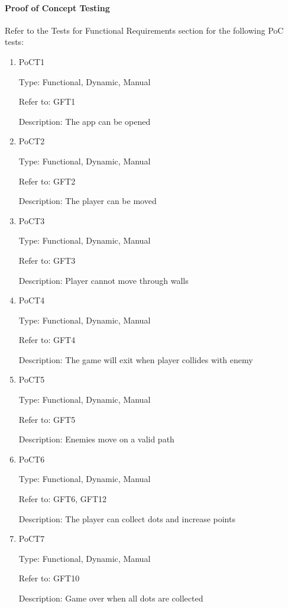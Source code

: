 \documentclass[12pt, titlepage]{article}
\begin{document}
\paragraph{Proof of Concept Testing}

Refer to the Tests for Functional Requirements section for the following PoC tests:

\begin{enumerate}

\item{PoCT1\\}

Type: Functional, Dynamic, Manual
					
Refer to: GFT1
					
Description: The app can be opened


\item{PoCT2\\}

Type: Functional, Dynamic, Manual
					
Refer to: GFT2
					
Description: The player can be moved


\item{PoCT3\\}

Type: Functional, Dynamic, Manual
					
Refer to: GFT3
					
Description: Player cannot move through walls


\item{PoCT4\\}

Type: Functional, Dynamic, Manual
					
Refer to: GFT4
					
Description: The game will exit when player collides with enemy


\item{PoCT5\\}

Type: Functional, Dynamic, Manual
					
Refer to: GFT5
					
Description: Enemies move on a valid path


\item{PoCT6\\}

Type: Functional, Dynamic, Manual
					
Refer to: GFT6, GFT12
					
Description: The player can collect dots and increase points


\item{PoCT7\\}

Type: Functional, Dynamic, Manual
					
Refer to: GFT10
					
Description: Game over when all dots are collected

					
\end{enumerate}
	
\end{document}

